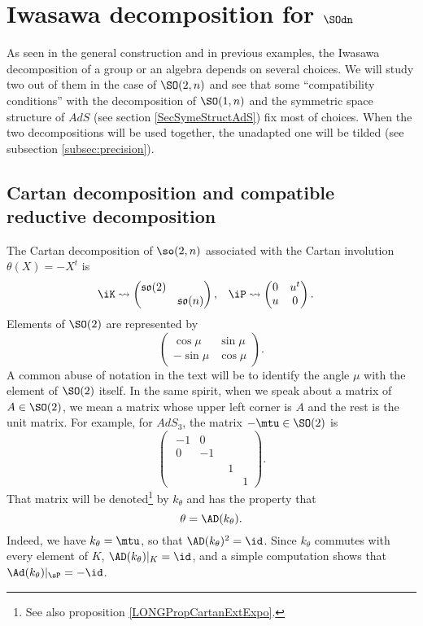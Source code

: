 \section{Iwasawa decomposition for \texorpdfstring{$\SOdn$}{SO2n}} \label{subsecIwasawa_un}

As seen in the general construction and in previous examples, the Iwasawa decomposition of a group or an algebra depends on several choices. We will study two out of them in the case of $\SO(2,n)$ and see that some ``compatibility conditions'' with the decomposition of $\SO(1,n)$ and the symmetric space structure of $AdS$ (see section \ref{SecSymeStructAdS}) fix most of choices. When the two decompositions will be used together, the unadapted one will be tilded (see subsection \ref{subsec:precision}).

\subsection{Cartan decomposition and compatible reductive decomposition}		\label{SubSecCartandeuxN}

The Cartan decomposition of $\so(2,n)$ associated with the Cartan involution $\theta(X)=-X^t$ is
\begin{align}\label{K_et_P}
   \iK&\leadsto
\begin{pmatrix}
\mathfrak{so}(2) \\
 & \mathfrak{so}(n)
\end{pmatrix},
&\iP&\leadsto\begin{pmatrix}
0 & u^t \\
u & 0
\end{pmatrix}.
\end{align}
 Elements of $\SO(2)$ are represented by
\[ 
  \begin{pmatrix}
\cos\mu&\sin\mu\\
-\sin\mu&\cos\mu
\end{pmatrix}.
\]
A common abuse of notation in the text will be to identify the angle $\mu$ with the element of $\SO(2)$ itself. In the same spirit, when we speak about a matrix of $A\in \SO(2)$, we mean a matrix whose upper left corner is $A$ and the rest is the unit matrix. For example, for $AdS_3$, the matrix $-\mtu\in \SO(2)$ is
\[
\begin{pmatrix}
\begin{matrix}
-1&0\\
0&-1
\end{matrix}\\
&1\\
&&1
\end{pmatrix}.
\]
That matrix will be denoted\footnote{See also proposition \ref{LONGPropCartanExtExpo}.} by $k_{\theta}$ and has the property that
\begin{equation}
	\theta=\AD(k_{\theta}).
\end{equation}
Indeed, we have $k_{\theta}=\mtu$, so that $\AD(k_{\theta})^2=\id$. Since $k_{\theta}$ commutes with every element of $K$, $\AD(k_{\theta})|_{K}=\id$, and a simple computation shows that $\Ad(k_{\theta})|_{\sP}=-\id$.

